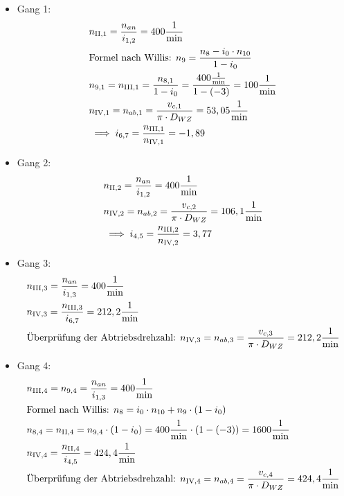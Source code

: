 \begin{itemize}
\item{Gang 1:}
\begin{align*}
	&n_{{\mathord{\mathrm{II}},1}} = \frac{n_{an}}{i_{1,2}} = 400 \frac{1}{\text{min}} \\
	&\text{Formel nach Willis: } n_{9}= \frac{n_8 - i_0 \cdot n_{10}}{1-i_0}\\
	&n_{9,1}= n_{\mathord{\mathrm{III}},1} = \frac{n_{8,1}}{1-i_0} = \frac{400 \frac{1}{\text{min}}}{1-(-3)} = 100 \frac{1}{\text{min}}\\
	&n_{\mathord{\mathrm{IV}},1} = n_{ab,1} =\frac{ v_{c,1}}{\pi \cdot D_{WZ}} = 53,05 \frac{1}{\text{min}} \\
	&\implies i_{6,7} = \frac{n_{{\mathord{\mathrm{III}},1}}}{n_{\mathord{\mathrm{IV}},1}} = -1,89 \\
\end{align*}
\item{Gang 2:}
\begin{align*}
	&n_{{\mathord{\mathrm{II}},2}} = \frac{n_{an}}{i_{1,2}} = 400 \frac{1}{\text{min}} \\
	&n_{\mathord{\mathrm{IV}},2} =n_{ab,2} = \frac{ v_{c,2}}{\pi \cdot D_{WZ}} =106,1 \frac{1}{\text{min}} \\
	&\implies i_{4,5} = \frac{ n_{\mathord{\mathrm{III}},2}}{n_{\mathord{\mathrm{IV}},2}} = 3,77 \\
\end{align*}
\item{Gang 3:}
\begin{align*}
		&n_{\mathord{\mathrm{III}},3} = \frac{n_{an}}{i_{1,3}} = 400 \frac{1}{\text{min}} \\
		&n_{\mathord{\mathrm{IV}},3} =\frac{ n_{\mathord{\mathrm{III}},3}}{i_{6,7}} =212,2 \frac{1}{\text{min}}\\	
		&\text{Überprüfung der Abtriebsdrehzahl: } n_{\mathord{\mathrm{IV}},3} =n_{ab,3} = \frac{ v_{c,3}}{\pi \cdot D_{WZ}} =212,2 \frac{1}{\text{min}} \\
\end{align*}
\item{Gang 4:}
\begin{align*}
	&n_{\mathord{\mathrm{III}},4} = n_{9,4}= \frac{n_{an}}{i_{1,3}} = 400 \frac{1}{\text{min}} \\
	&\text{Formel nach Willis: } n_{8}= i_0 \cdot n_{10} + n_9\cdot (1-i_0) \\
	&n_{8,4}= n_{\mathord{\mathrm{II}},4} = n_{9,4}\cdot (1-i_0) = 400 \frac{1}{\text{min}} \cdot (1- (-3)) = 1600 \frac{1}{\text{min}}\\
	&n_{\mathord{\mathrm{IV}},4} =\frac{ n_{\mathord{\mathrm{II}},4}}{i_{4,5}} =424,4 \frac{1}{\text{min}}\\
	&\text{Überprüfung der Abtriebsdrehzahl: } n_{\mathord{\mathrm{IV}},4} =n_{ab,4} = \frac{ v_{c,4}}{\pi \cdot D_{WZ}} =424,4 \frac{1}{\text{min}} \\
\end{align*}
\end{itemize}